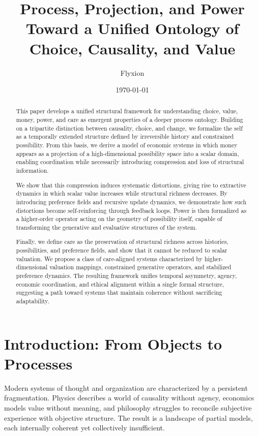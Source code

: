 \documentclass[11pt,a4paper]{article}
\title{\textbf{Process, Projection, and Power}\\[0.5em]
\normalsize Toward a Unified Ontology of Choice, Causality, and Value}
\author{Flyxion}
\date{\today}
\theoremstyle{definition}
\theoremstyle{remark}
\begin{document}
\maketitle

\begin{abstract}
This paper develops a unified structural framework for understanding choice, value, money, power, and care as emergent properties of a deeper process ontology. Building on a tripartite distinction between causality, choice, and change, we formalize the self as a temporally extended structure defined by irreversible history and constrained possibility. From this basis, we derive a model of economic systems in which money appears as a projection of a high-dimensional possibility space into a scalar domain, enabling coordination while necessarily introducing compression and loss of structural information.

We show that this compression induces systematic distortions, giving rise to extractive dynamics in which scalar value increases while structural richness decreases. By introducing preference fields and recursive update dynamics, we demonstrate how such distortions become self-reinforcing through feedback loops. Power is then formalized as a higher-order operator acting on the geometry of possibility itself, capable of transforming the generative and evaluative structures of the system.

Finally, we define care as the preservation of structural richness across histories, possibilities, and preference fields, and show that it cannot be reduced to scalar valuation. We propose a class of care-aligned systems characterized by higher-dimensional valuation mappings, constrained generative operators, and stabilized preference dynamics. The resulting framework unifies temporal asymmetry, agency, economic coordination, and ethical alignment within a single formal structure, suggesting a path toward systems that maintain coherence without sacrificing adaptability.
\end{abstract}

\tableofcontents
\newpage

\section{Introduction: From Objects to Processes}

Modern systems of thought and organization are characterized by a persistent fragmentation. Physics describes a world of causality without agency, economics models value without meaning, and philosophy struggles to reconcile subjective experience with objective structure. The result is a landscape of partial models, each internally coherent yet collectively insufficient.
\end{document}
